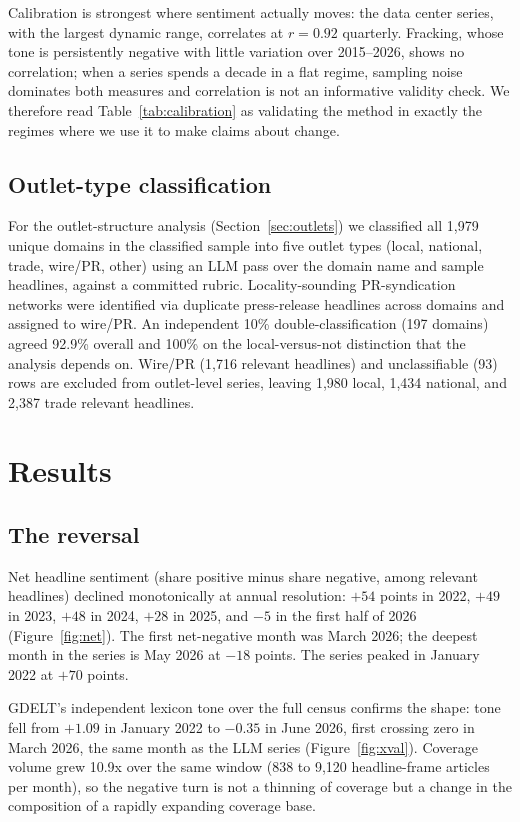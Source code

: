 \documentclass[11pt]{article}
\begin{document}
Calibration is strongest where sentiment actually moves: the data center
series, with the largest dynamic range, correlates at $r=0.92$ quarterly.
Fracking, whose tone is persistently negative with little variation over
2015--2026, shows no correlation; when a series spends a decade in a flat
regime, sampling noise dominates both measures and correlation is not an
informative validity check. We therefore read Table~\ref{tab:calibration}
as validating the method in exactly the regimes where we use it to make
claims about change.

\subsection{Outlet-type classification}

For the outlet-structure analysis (Section~\ref{sec:outlets}) we classified
all 1,979 unique domains in the classified sample into five outlet types
(local, national, trade, wire/PR, other) using an LLM pass over the domain
name and sample headlines, against a committed rubric. Locality-sounding
PR-syndication networks were identified via duplicate press-release
headlines across domains and assigned to wire/PR. An independent 10\%
double-classification (197 domains) agreed 92.9\% overall and 100\% on the
local-versus-not distinction that the analysis depends on. Wire/PR (1,716
relevant headlines) and unclassifiable (93) rows are excluded from
outlet-level series, leaving 1,980 local, 1,434 national, and 2,387 trade
relevant headlines.

\section{Results}

\subsection{The reversal}

Net headline sentiment (share positive minus share negative, among relevant
headlines) declined monotonically at annual resolution: $+54$ points in
2022, $+49$ in 2023, $+48$ in 2024, $+28$ in 2025, and $-5$ in the first
half of 2026 (Figure~\ref{fig:net}). The first net-negative month was March
2026; the deepest month in the series is May 2026 at $-18$ points. The
series peaked in January 2022 at $+70$ points.

GDELT's independent lexicon tone over the full census confirms the shape:
tone fell from $+1.09$ in January 2022 to $-0.35$ in June 2026, first
crossing zero in March 2026, the same month as the LLM series
(Figure~\ref{fig:xval}). Coverage volume grew 10.9x over the same window
(838 to 9,120 headline-frame articles per month), so the negative turn is
not a thinning of coverage but a change in the composition of a rapidly
expanding coverage base.
\end{document}
